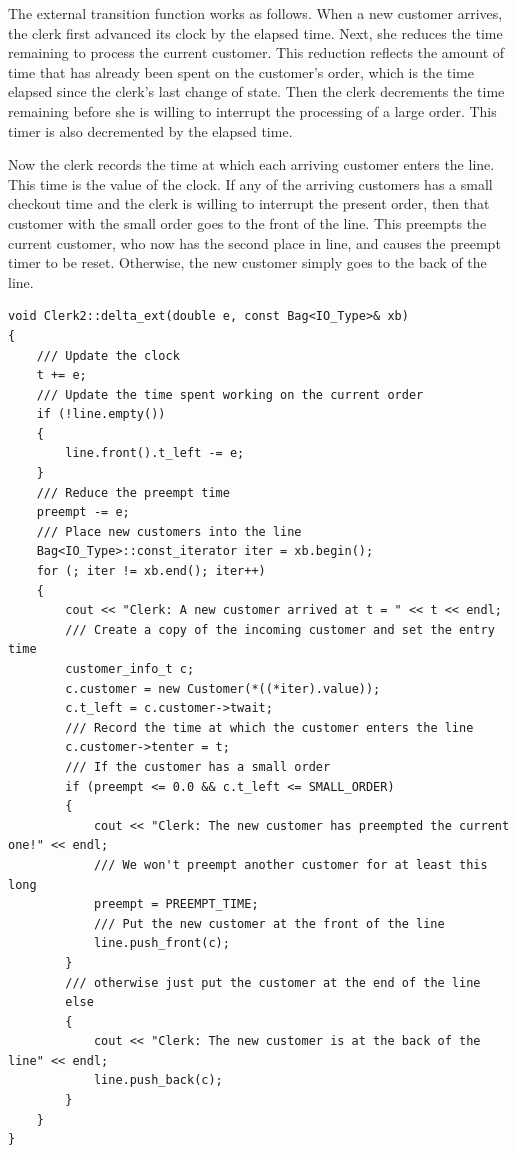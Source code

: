 The external transition function works as follows. When a new customer arrives, the clerk first advanced its clock by the elapsed time. Next, she reduces the time remaining to process the current customer. This reduction reflects the amount of time that has already been spent on the customer's order, which is the time elapsed since the clerk's last change of state. Then the clerk decrements the time remaining before she is willing to interrupt the processing of a large order. This timer is also decremented by the elapsed time.

Now the clerk records the time at which each arriving customer enters the line. This time is the value of the clock. If any of the arriving customers has a small checkout time and the clerk is willing to interrupt the present order, then that customer with the small order goes to the front of the line. This preempts the current customer, who now has the second place in line, and causes the preempt timer to be reset. Otherwise, the new customer simply goes to the back of the line.
\begin{verbatim}
void Clerk2::delta_ext(double e, const Bag<IO_Type>& xb)
{
    /// Update the clock
    t += e;
    /// Update the time spent working on the current order
    if (!line.empty())
    {
        line.front().t_left -= e;
    }
    /// Reduce the preempt time
    preempt -= e;
    /// Place new customers into the line
    Bag<IO_Type>::const_iterator iter = xb.begin();
    for (; iter != xb.end(); iter++)
    {
        cout << "Clerk: A new customer arrived at t = " << t << endl;
        /// Create a copy of the incoming customer and set the entry time
        customer_info_t c;
        c.customer = new Customer(*((*iter).value));
        c.t_left = c.customer->twait;
        /// Record the time at which the customer enters the line
        c.customer->tenter = t;
        /// If the customer has a small order
        if (preempt <= 0.0 && c.t_left <= SMALL_ORDER)
        {
            cout << "Clerk: The new customer has preempted the current one!" << endl;
            /// We won't preempt another customer for at least this long
            preempt = PREEMPT_TIME;
            /// Put the new customer at the front of the line
            line.push_front(c);
        }
        /// otherwise just put the customer at the end of the line
        else 
        {
            cout << "Clerk: The new customer is at the back of the line" << endl;
            line.push_back(c);
        }
    }
}
\end{verbatim}

